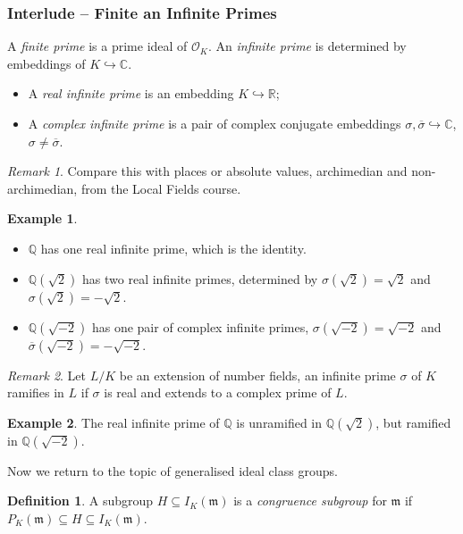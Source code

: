 \documentclass[11pt]{article}
\theoremstyle{definition}
\newtheorem{definition}{Definition}[section]
\newtheorem*{example*}{Example}
\theoremstyle{plain}
\theoremstyle{remark}
\newtheorem*{remark*}{Remark}
\newcommand{\QQ}{\mathbb{Q}}
\newcommand{\RR}{\mathbb{R}}
\newcommand{\CC}{\mathbb{C}}
\newcommand{\cO}{\mathcal{O}}
\newcommand{\fm}{\mathfrak{m}}
\begin{document}
\subsubsection*{Interlude -- Finite an Infinite Primes}
A \emph{finite prime} is a prime ideal of $\cO_K$. An \emph{infinite prime} is determined by embeddings of $K \hookrightarrow \CC$.
\begin{itemize}
    \item A \emph{real infinite prime} is an embedding $K \hookrightarrow \RR$;
    \item A \emph{complex infinite prime} is a pair of complex conjugate embeddings $\sigma, \overline{\sigma} \hookrightarrow \CC$, $\sigma \neq \overline{\sigma}$.
\end{itemize}

\begin{remark*}
    Compare this with places or absolute values, archimedian and non-archimedian, from the Local Fields course.
\end{remark*}

\begin{example*}\phantom{}
    \begin{itemize}
        \item $\QQ$ has one real infinite prime, which is the identity.
        \item $\QQ(\sqrt{2})$ has two real infinite primes, determined by $\sigma(\sqrt{2}) = \sqrt{2}$ and $\sigma(\sqrt{2}) = -\sqrt{2}$.
        \item $\QQ(\sqrt{-2})$ has one pair of complex infinite primes, $\sigma(\sqrt{-2}) = \sqrt{-2}$ and $\overline{\sigma}(\sqrt{-2}) = -\sqrt{-2}$.
    \end{itemize}
\end{example*}

\begin{remark*}
    Let $L/K$ be an extension of number fields, an infinite prime $\sigma$ of $K$ ramifies in $L$ if $\sigma$ is real and extends to a complex prime of $L$.
\end{remark*}

\begin{example*}
    The real infinite prime of $\QQ$ is unramified in $\QQ(\sqrt{2})$, but ramified in $\QQ(\sqrt{-2})$.
\end{example*}

\noindent Now we return to the topic of generalised ideal class groups.

\begin{definition}\label{def:2_17}
    A subgroup $H \subseteq I_K(\fm)$ is a \emph{congruence subgroup} for $\fm$ if $P_K(\fm) \subseteq H \subseteq I_K(\fm)$.
\end{definition}
\end{document}
